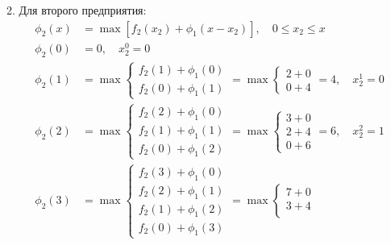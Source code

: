 \documentclass{article}
\begin{document}
2. Для второго предприятия:
\[
    \begin{aligned}
        \phi_2(x) & = \max \left[ f_2(x_2) + \phi_1(x - x_2) \right], \quad 0 \leq x_2 \leq x \\
        \phi_2(0) & = 0, \quad x_2^0 = 0                                                      \\
        \phi_2(1) & = \max \begin{cases}
                               f_2(1) + \phi_1(0) \\
                               f_2(0) + \phi_1(1)
                           \end{cases} = \max \begin{cases}
                                                  2 + 0 \\
                                                  0 + 4
                                              \end{cases} = 4, \quad x_2^1 = 0                \\
        \phi_2(2) & = \max \begin{cases}
                               f_2(2) + \phi_1(0) \\
                               f_2(1) + \phi_1(1) \\
                               f_2(0) + \phi_1(2)
                           \end{cases} = \max \begin{cases}
                                                  3 + 0 \\
                                                  2 + 4 \\
                                                  0 + 6
                                              \end{cases} = 6, \quad x_2^2 = 1                \\
        \phi_2(3) & = \max \begin{cases}
                               f_2(3) + \phi_1(0) \\
                               f_2(2) + \phi_1(1) \\
                               f_2(1) + \phi_1(2) \\
                               f_2(0) + \phi_1(3)
                           \end{cases} = \max \begin{cases}
                                                  7 + 0 \\
                                                  3 + 4 \\

\end{cases}
\end{aligned}\]
\end{document}
